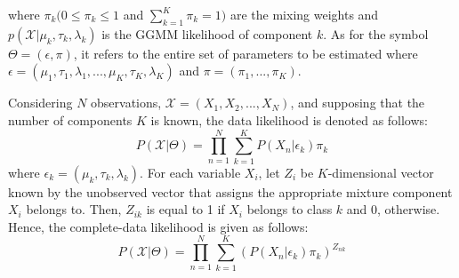 \documentclass[letterpaper]{article}
\begin{document}
where $\pi_k(0\leq\pi_k\leq1$ and $\sum_{k=1}^{K} \pi_k = 1)$ are the mixing weights and $p(\mathcal{X}|\mu_k, \tau_k, \lambda_k)$ is the GGMM likelihood of component $k$. 
As for the symbol $\Theta = (\epsilon, \pi)$, it refers to the entire set of parameters to be estimated where $\epsilon = (\mu_1, \tau_1, \lambda_1, ..., \mu_K, \tau_K, \lambda_K)$ and $\pi=(\pi_1,...,\pi_K)$. 

Considering $N$ observations,  $\mathcal{X} = (X_1, X_2, ..., X_N)$, and supposing that the number of components $K$ is known, the data likelihood is denoted as follows:
\begin{equation}
    P(\mathcal{X}|\Theta) = \prod_{n = 1}^{N}\sum_{k=1}^{K} P({X}_n|\epsilon_k)\pi_k
\end{equation}
where $\epsilon_k = (\mu_k, \tau_k, \lambda_k)$. 
For each variable ${X}_i$, let $Z_i$  be $K$-dimensional vector known by the unobserved vector that assigns the appropriate mixture component ${X}_i$ belongs to. Then, $Z_{ik}$ is equal to 1 if ${X}_i$ belongs to class $k$ and 0, otherwise. Hence, the complete-data likelihood is given as follows:
\begin{equation}
    P(\mathcal{X}|\Theta) = \prod_{n = 1}^{N}\sum_{k=1}^{K} (P({X}_n|\epsilon_k)\pi_k)^{Z_{nk}}
\end{equation}



\end{document}
